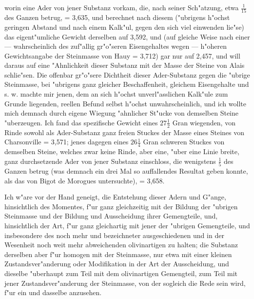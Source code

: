 \documentclass[a4paper, 11pt, oneside, german]{article}
\begin{document}
{worin eine Ader von jener Substanz vorkam, die, nach seiner Sch"atzung, etwa $\frac{1}{15}$ des Ganzen betrug, = 3,635, und berechnet nach diesem ("ubrigens h"ochst geringen Abstand und nach einem Kalk"ul, gegen den sich viel einwenden lie"se) das eigent"umliche Gewicht derselben auf 3,592, und (auf gleiche Weise nach einer --- wahrscheinlich des zuf"allig gr"o"seren Eisengehaltes wegen --- h"oheren Gewichtsangabe der Steinmasse von Hauy = 3,712) gar nur auf 2,457, und will daraus auf eine "Ahnlichkeit dieser Substanz mit der Masse der Steine von Alais schlie"sen. Die offenbar gr"o"sere Dichtheit dieser Ader-Substanz gegen die "ubrige Steinmasse, bei "ubrigens ganz gleicher Beschaffenheit, gleichem Eisengehalte und s. w. machte mir jenen, dem an sich h"ochst unverl"asslichen Kalk"ule zum Grunde liegenden, reellen Befund selbst h"ochst unwahrscheinlich, und ich wollte mich demnach durch eigene Wiegung "ahnlicher St"ucke von demselben Steine "uberzeugen. Ich fand das spezifische Gewicht eines $27\frac{1}{2}$ Gran wiegenden, von Rinde sowohl als Ader-Substanz ganz freien Stuckes der Masse eines Steines von Charsonville = 3,571; jenes dagegen eines $26\frac{1}{4}$ Gran schweren Stuckes von demselben Steine, welches zwar keine Rinde, aber eine, "uber eine Linie breite, ganz durchsetzende Ader von jener Substanz einschloss, die wenigstens $\frac{1}{5}$ des Ganzen betrug (was demnach ein drei Mal so auffallendes Resultat geben konnte, als das von Bigot de Morogues untersuchte), = 3,658.}

Ich w"are vor der Hand geneigt, die Entstehung dieser Adern und G"ange, hinsichtlich des Momentes, f"ur ganz gleichzeitig mit der Bildung der "ubrigen Steinmasse und der Bildung und Ausscheidung ihrer Gemengteile, und, hinsichtlich der Art, f"ur ganz gleichartig mit jener der "ubrigen Gemengteile, und insbesondere des noch mehr und bezeichneter ausgeschiedenen und in der Wesenheit noch weit mehr abweichenden olivinartigen zu halten; die Substanz derselben aber f"ur homogen mit der Steinmasse, nur etwa mit einer kleinen Zustandsver"anderung oder Modifikation in der Art der Ausscheidung, und dieselbe "uberhaupt zum Teil mit dem olivinartigen Gemengteil, zum Teil mit jener Zustandsver"anderung der Steinmasse, von der sogleich die Rede sein wird, f"ur ein und dasselbe anzusehen.
\end{document}

